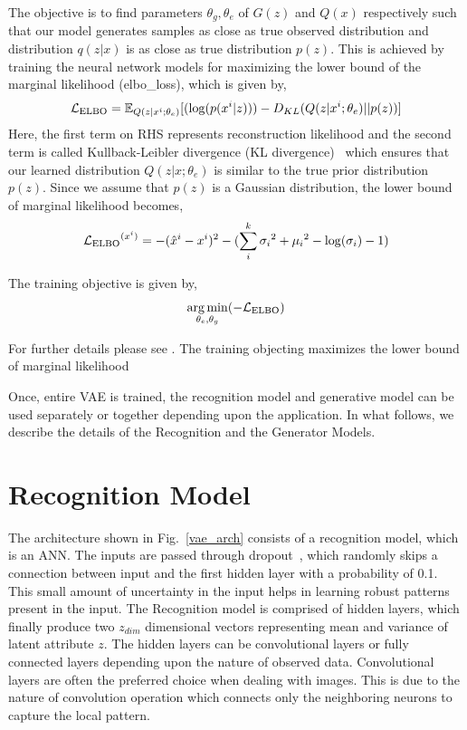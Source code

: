 The objective is to find parameters $\theta_g, \theta_e $ of $G(z)$ and $Q(x)$ respectively such that our model generates samples as close as true observed distribution and distribution $q(z|x)$ is as close as true distribution $p(z)$.
This is achieved by training the neural network models for maximizing the lower bound of the marginal likelihood (\ac{elbo_loss}), which is given by,
\begin{equation}
  \mathcal{L_{\text{ELBO}}} = \mathbb{E}_{Q(z|x^{i}; \theta_e)}[(\log(p(x^{i}|z))) - D_{KL}(Q(z|x^{i}; \theta_e)||p(z))]  \\
\end{equation}
Here, the first term on RHS represents reconstruction likelihood and the second term is called Kullback-Leibler divergence (KL divergence)~\cite{kullback1951} which ensures that our learned distribution $Q(z|x;\theta_e)$ is similar to the true prior distribution $p(z)$.
Since we assume that $p(z)$ is a Gaussian distribution, the lower bound of marginal likelihood becomes,
\begin{equation}
   \mathcal{L_{\text{ELBO}}}^{(x^i)} = - (\hat{x}^i-x^i)^2 - (\sum_i^{k} {\sigma_i}^2 + {\mu_i}^2 - \log(\sigma_i) - 1) \\
\end{equation}

The training objective is given by,
\begin{equation}
 \operatorname*{arg\,min}_{\theta_e, \theta_g} ( - \mathcal{L_{\text{ELBO}}})
\end{equation}

For further details please see \cite{Kingma2014AutoEncodingVB}. The training objecting maximizes the lower bound of marginal likelihood


Once, entire VAE is trained, the recognition model and generative model can be used separately or together depending upon the application. In what follows, we describe the details of the Recognition and the Generator Models.

\section{Recognition Model}

The architecture shown in Fig.~\ref{vae_arch} consists of a recognition model, which is an ANN.
The inputs are passed through dropout~\cite{srivastava2014Dropout}, which randomly skips a connection between input and the first hidden layer with a probability of 0.1.
This small amount of uncertainty in the input helps in learning robust patterns present in the input.
The Recognition model is comprised of hidden layers, which finally produce two $z_{dim}$ dimensional vectors representing mean and variance of latent attribute $z$.
The hidden layers can be convolutional layers or fully connected layers depending upon the nature of observed data.
Convolutional layers are often the preferred choice when dealing with images. This is due to the nature of convolution operation which connects only the neighboring neurons to capture the local pattern. 

